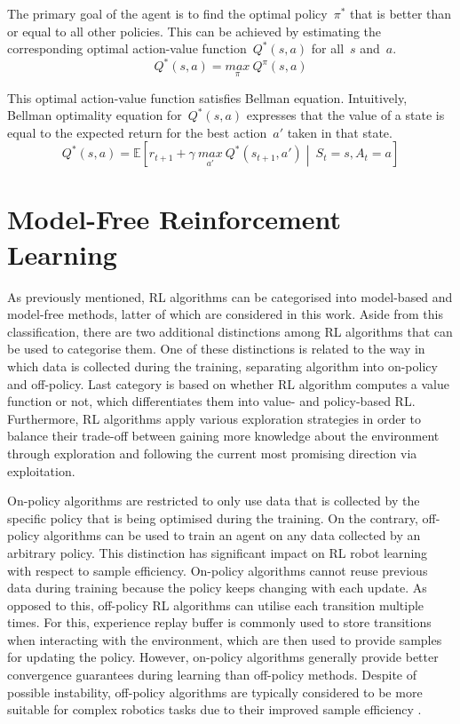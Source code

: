 The primary goal of the agent is to find the optimal policy~\(\pi^{*}\) that is better than or equal to all other policies. This can be achieved by estimating the corresponding optimal action-value function~\(Q^{*}(s, a)\) for all~\(s\) and~\(a\).
\begin{equation}
    Q^{*}(s, a) = \underset{\pi}{max}\ Q^{\pi}(s, a)
    \label{eq:optimal_action_value_function}
\end{equation}

This optimal action-value function satisfies Bellman equation. Intuitively, Bellman optimality equation for~\(Q^{*}(s, a)\) expresses that the value of a state is equal to the expected return for the best action~\(a'\) taken in that state.
\begin{equation}
    Q^{*}(s, a) = \mathbb{E} \left[ r_{t+1} + \gamma\ \underset{a'}{max}\ Q^{*}(s_{t+1}, a') \middle\vert\ S_{t}{=}s, A_{t}{=}a \right]
\end{equation}


\section{Model-Free Reinforcement Learning}

As previously mentioned, RL algorithms can be categorised into model-based and model-free methods, latter of which are considered in this work. Aside from this classification, there are two additional distinctions among RL algorithms that can be used to categorise them. One of these distinctions is related to the way in which data is collected during the training, separating algorithm into on-policy and off-policy. Last category is based on whether RL algorithm computes a value function or not, which differentiates them into value- and policy-based RL. Furthermore, RL algorithms apply various exploration strategies in order to balance their trade-off between gaining more knowledge about the environment through exploration and following the current most promising direction via exploitation.

On-policy algorithms are restricted to only use data that is collected by the specific policy that is being optimised during the training. On the contrary, off-policy algorithms can be used to train an agent on any data collected by an arbitrary policy. This distinction has significant impact on RL robot learning with respect to sample efficiency. On-policy algorithms cannot reuse previous data during training because the policy keeps changing with each update. As opposed to this, off-policy RL algorithms can utilise each transition multiple times. For this, experience replay buffer \cite{mnih_human-level_2015} is commonly used to store transitions when interacting with the environment, which are then used to provide samples for updating the policy. However, on-policy algorithms generally provide better convergence guarantees during learning than off-policy methods. Despite of possible instability, off-policy algorithms are typically considered to be more suitable for complex robotics tasks due to their improved sample efficiency \cite{quillen_deep_2018}.


